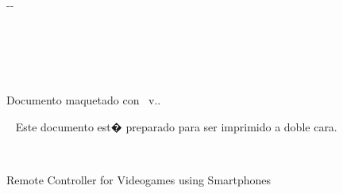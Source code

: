 {\begin{cambiamargen}{-\cambioIzquierdo}{-\cambioDerecho}
\begin{large}
\begin{center}
\textbf{\autorPortadaVal}\\[0.3cm]

\textbf{\institucionVal}\\[1em]
\textbf{\fechaPublicacionVal}

\end{center}

\end{large}

\vfill

\end{cambiamargen}

\newpage

\thispagestyle{empty}
\mbox{ }
\vfill%
\begin{small} 
\begin{center}
\ifx\noTeXiSCreditsVal\undefined
  Documento maquetado con \texis\ v.\texisVer.
\else
\mbox{ }
\fi
\end{center}
\end{small}
\vspace*{2cm}
\begin{small} 
\begin{center}
\ifx\explicacionDobleCaraVal\undefined
\mbox{ }
\else
\noindent Este documento est� preparado para ser imprimido a doble
cara.
\fi
\end{center}
\end{small}


\newpage

\thispagestyle{empty}

\mbox{ }

\begin{Huge}
\begin{center}
Remote Controller for Videogames using Smartphones
\end{center}
\end{Huge}

\vfill

\begin{large}
\begin{center}
\textoPrimerSubtituloPortadaVal
\\ \mbox{ } \\ \mbox{ } \\ 
\textoSegundoSubtituloPortadaVal \\ [0.3em]
\end{center}
\end{large}

}
